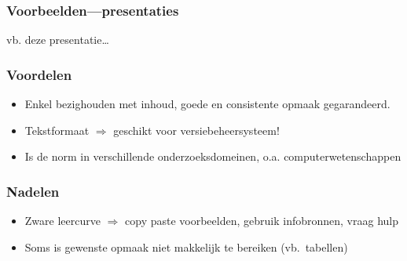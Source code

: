 \documentclass[aspectratio=169]{beamer}
\begin{document}
\begin{frame}
  \frametitle{Voorbeelden---presentaties}

  \begin{center}
  vb. deze presentatie\ldots
  \end{center}

\end{frame}

\begin{frame}
  \frametitle{Voordelen}

  \begin{itemize}
    \item<+-> Enkel bezighouden met inhoud, goede en consistente opmaak gegarandeerd.
    \item<+-> Tekstformaat $\Rightarrow$ geschikt voor versiebeheersysteem!
    \item<+-> Is de norm in verschillende onderzoeksdomeinen, o.a. computerwetenschappen
  \end{itemize}
\end{frame}


\begin{frame}
  \frametitle{Nadelen}

  \begin{itemize}
    \item<+-> Zware leercurve $\Rightarrow$ copy paste voorbeelden, gebruik infobronnen, vraag hulp
    \item<+-> Soms is gewenste opmaak niet makkelijk te bereiken (vb.~tabellen)
  \end{itemize}

\end{frame}
\end{document}
